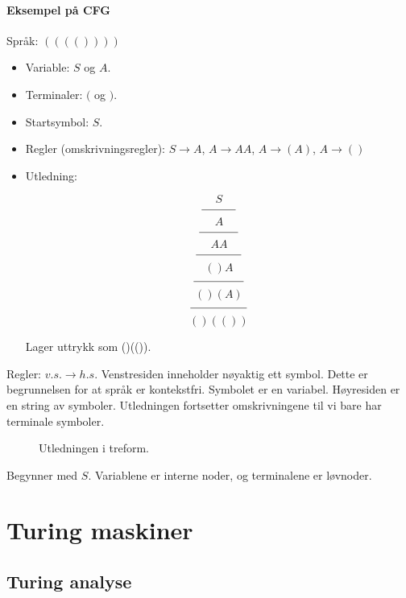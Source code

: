 \documentclass[11pt,a4paper]{article}
\begin{document}
\paragraph{Eksempel på CFG}
Språk: $(((())))$

\begin{itemize}
\item{Variable: $S$ og $A$.}
\item{Terminaler: $($ og $)$.}
\item{Startsymbol: $S$.}
\item{Regler (omskrivningsregler): $S \rightarrow A$, $A \rightarrow AA$, $A \rightarrow (A)$, $A \rightarrow ()$}
\item{Utledning: 
\begin{spacing}{0.4}$$ S $$
$$\line(1,0){30}$$
$$ A $$
$$\line(1,0){35}$$
$$ AA $$
$$\line(1,0){40}$$
$$() A$$
$$\line(1,0){45}$$
$$() (A)$$
$$\line(1,0){50}$$
$$() (())$$\end{spacing}}
Lager uttrykk som ()(()).
\end{itemize}

Regler: $v.s. \rightarrow h.s.$
Venstresiden inneholder nøyaktig ett symbol. Dette er begrunnelsen for at språk er kontekstfri. Symbolet er en variabel.
Høyresiden er en string av symboler. Utledningen fortsetter omskrivningene til vi bare har terminale symboler.

\begin{figure}[h!]
\centering
{}
\caption{Utledningen i treform.}
\end{figure}

Begynner med $S$. Variablene er interne noder, og terminalene er løvnoder.

\section{Turing maskiner}
\subsection{Turing analyse}
\end{document}
